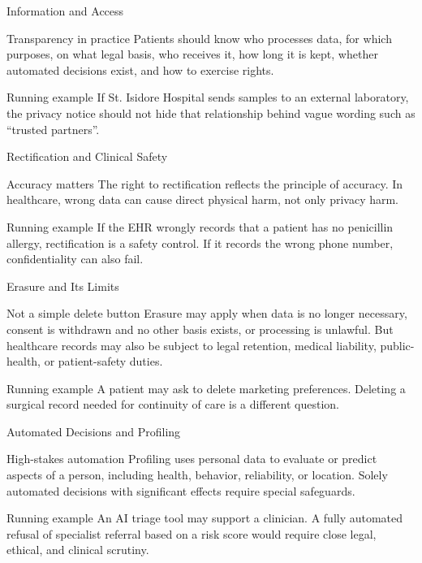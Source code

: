 \documentclass[presentation]{beamer}
\newcommand{\scenario}{St. Isidore Hospital}
\begin{document}
\begin{frame}[c]{Information and Access}
\begin{block}{Transparency in practice}
Patients should know who processes data, for which purposes, on what legal basis, who receives it,
how long it is kept, whether automated decisions exist, and how to exercise rights.
\end{block}

\begin{exampleblock}{Running example}
If \scenario{} sends samples to an external laboratory, the privacy notice should not hide that
relationship behind vague wording such as ``trusted partners''.
\end{exampleblock}
\end{frame}

\begin{frame}[c]{Rectification and Clinical Safety}
\begin{block}{Accuracy matters}
The right to rectification reflects the principle of accuracy. In healthcare, wrong data can cause
direct physical harm, not only privacy harm.
\end{block}

\begin{exampleblock}{Running example}
If the EHR wrongly records that a patient has no penicillin allergy, rectification is a safety
control. If it records the wrong phone number, confidentiality can also fail.
\end{exampleblock}
\end{frame}

\begin{frame}[c]{Erasure and Its Limits}
\begin{block}{Not a simple delete button}
Erasure may apply when data is no longer necessary, consent is withdrawn and no other basis exists,
or processing is unlawful. But healthcare records may also be subject to legal retention, medical
liability, public-health, or patient-safety duties.
\end{block}

\begin{exampleblock}{Running example}
A patient may ask to delete marketing preferences. Deleting a surgical record needed for continuity
of care is a different question.
\end{exampleblock}
\end{frame}

\begin{frame}[c]{Automated Decisions and Profiling}
\begin{block}{High-stakes automation}
Profiling uses personal data to evaluate or predict aspects of a person, including health,
behavior, reliability, or location. Solely automated decisions with significant effects require
special safeguards.
\end{block}

\begin{exampleblock}{Running example}
An AI triage tool may support a clinician. A fully automated refusal of specialist referral based on
a risk score would require close legal, ethical, and clinical scrutiny.
\end{exampleblock}
\end{frame}
\end{document}
